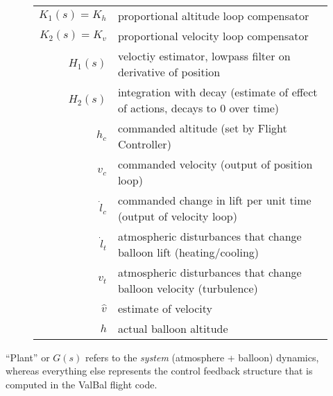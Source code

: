 \documentclass[11pt]{article}
\begin{document}
\begin{figure}[h!]
\begin{tikzpicture}
\end{tikzpicture}\\
\vspace{0.5cm}
\begin{tabular}{r l}
$K_1(s) = K_h$ & proportional altitude loop compensator \\
$K_2(s) = K_v$ & proportional velocity loop compensator \\ 
$H_1(s)$ & veloctiy estimator, lowpass filter on derivative of position\\
$H_2(s)$ & integration with decay \footnotesize (estimate of effect of actions, decays to 0 over time) \vspace{.3cm}\\
$h_c$ & commanded altitude \footnotesize (set by Flight Controller) \\
$v_c$ & commanded velocity \footnotesize (output of position loop) \\
$\dot l_c$ & commanded change in lift per unit time  \footnotesize (output of velocity loop)\\
$\dot l_t$ & atmospheric disturbances that change balloon lift  \footnotesize (heating/cooling)\\
$v_t$ & atmospheric disturbances that change balloon velocity \footnotesize (turbulence)\\
$\hat v$ & estimate of velocity\\
$h$ & actual balloon altitude\\

\end{tabular}
\end{figure}

``Plant'' or $G(s)$ refers to the \emph{system} (atmosphere + balloon) dynamics, whereas everything else represents the control feedback structure that is computed in the ValBal flight code.
\end{document}
